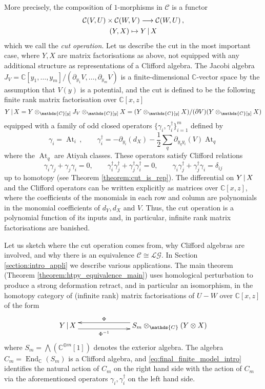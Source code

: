 \documentclass[english,letter paper,12pt,leqno]{article}
\theoremstyle{example}
\numberwithin{equation}{section}
\def\LG{\mathcal{LG}}
\def\be{\begin{equation}}
\def\ee{\end{equation}}
\def\nC{\mathds{C}}
\def\L{\mathcal{C}}
\def\ferm{\gamma}
\def\fermc{\gamma^\dagger}
\DeclareMathOperator{\End}{End}
\DeclareMathOperator{\At}{At}
\begin{document}
More precisely, the composition of $1$-morphisms in $\L$ is a functor
\begin{gather}
\L(V,U) \times \L(W,V) \lto \L(W,U)\,,\label{eq:cut_functor_intro}\\
(Y,X) \mapsto Y \l X
\end{gather}
which we call the \emph{cut operation}. Let us describe the cut in the most important case, where $Y, X$ are matrix factorisations as above, not equipped with any additional structure as representations of a Clifford algebra. The Jacobi algebra $J_V = \nC[y_1,\ldots,y_m]/(\partial_{y_1} V, \ldots, \partial_{y_m} V)$ is a finite-dimensional $\nC$-vector space by the assumption that $V(y)$ is a potential, and the cut is defined to be the following finite rank matrix factorisation over $\nC[x,z]$
\be
Y \l X = Y \otimes_{\nC[y]} J_V \otimes_{\nC[y]} X = ( Y \otimes_{\nC[y]} X ) / (\partial V) (Y \otimes_{\nC[y]} X )
\ee
equipped with a family of odd closed operators $\{\ferm_i, \fermc_i\}_{i=1}^m$ defined by
\begin{equation}\label{eq:intro_clifford_act1_intro}
\ferm_i = \At_i\,, \qquad \fermc_i = - \partial_{y_i}(d_X) - \frac{1}{2} \sum_q \partial_{y_q y_i}(V) \At_{q}
\end{equation}
where the $\At_q$ are Atiyah classes. These operators satisfy Clifford relations
\be\label{eq:clifford_relations_intro}
\ferm_i \ferm_j + \ferm_j \ferm_i = 0, \qquad \fermc_i \fermc_j + \fermc_j \fermc_i = 0, \qquad \ferm_i \fermc_j + \fermc_j \ferm_i = \delta_{ij}
\ee
up to homotopy (see Theorem \ref{theorem:cut_is_rep}). The differential on $Y \,|\, X$ and the Clifford operators can be written explicitly as matrices over $\nC[x,z]$, where the coefficients of the monomials in each row and column are polynomials in the monomial coefficients of $d_Y, d_X$ and $V$. Thus, the cut operation is a polynomial function of its inputs and, in particular, infinite rank matrix factorisations are banished. 

Let us sketch where the cut operation comes from, why Clifford algebras are involved, and why there is an equivalence $\L \cong \LG$. In Section \ref{section:intro_appli} we describe various applications. The main theorem (Theorem \ref{theorem:htpy_equivalence_main}) uses homological perturbation to produce a strong deformation retract, and in particular an isomorphism, in the homotopy category of (infinite rank) matrix factorisations of $U - W$ over $\nC[x,z]$ of the form
\begin{equation}\label{eq:final_finite_model_intro}
\xymatrix@C+4pc{
Y \l X \ar@<-1ex>[r]_-{\Phi^{-1}} & S_m \otimes_{\nC} ( Y \otimes X )\ar@<-1ex>[l]_-{\Phi}
}
\end{equation}
where $S_m = \bigwedge ( \nC^{\oplus m}[1] )$ denotes the exterior algebra. The algebra $C_m = \End_{\nC}(S_m)$ is a Clifford algebra, and \eqref{eq:final_finite_model_intro} identifies the natural action of $C_m$ on the right hand side with the action of $C_m$ via the aforementioned operators $\ferm_i, \fermc_i$ on the left hand side.
\end{document}
